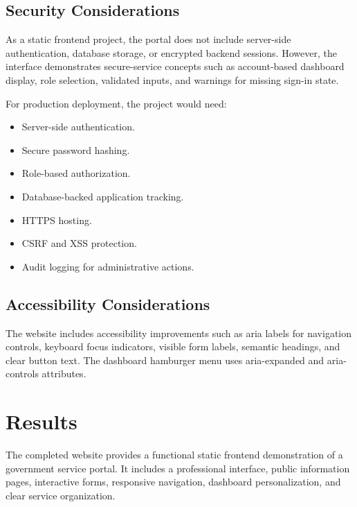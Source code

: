 \documentclass[12pt,a4paper]{report}
\begin{document}
\section{Security Considerations}
As a static frontend project, the portal does not include server-side authentication, database storage, or encrypted backend sessions. However, the interface demonstrates secure-service concepts such as account-based dashboard display, role selection, validated inputs, and warnings for missing sign-in state.

For production deployment, the project would need:
\begin{itemize}[leftmargin=0.4in]
    \item Server-side authentication.
    \item Secure password hashing.
    \item Role-based authorization.
    \item Database-backed application tracking.
    \item HTTPS hosting.
    \item CSRF and XSS protection.
    \item Audit logging for administrative actions.
\end{itemize}

\section{Accessibility Considerations}
The website includes accessibility improvements such as aria labels for navigation controls, keyboard focus indicators, visible form labels, semantic headings, and clear button text. The dashboard hamburger menu uses aria-expanded and aria-controls attributes.

\chapter{Results}
The completed website provides a functional static frontend demonstration of a government service portal. It includes a professional interface, public information pages, interactive forms, responsive navigation, dashboard personalization, and clear service organization.
\end{document}
